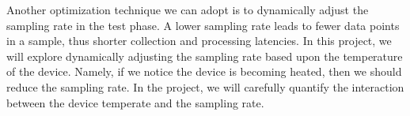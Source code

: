 Another optimization technique we can adopt is to dynamically adjust the sampling rate in the test phase. A lower sampling rate leads to fewer data points in a sample, thus shorter collection and processing latencies. In this project, we will explore dynamically adjusting the sampling rate based upon the temperature of the device. Namely, if we notice the device is becoming heated, then we should reduce the sampling rate. In the project, we will carefully quantify the interaction between the device temperate and the sampling rate.

